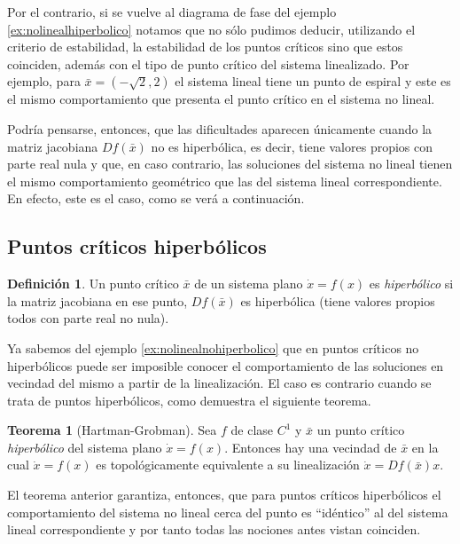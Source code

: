 \documentclass[11pt]{book}
\theoremstyle{definition}
\newtheorem{definition}{Definición}
\numberwithin{definition}{section}
\theoremstyle{theorem}
\newtheorem{theorem}{Teorema}
\numberwithin{theorem}{section}
\numberwithin{lemma}{section}
\numberwithin{corollary}{section}
\theoremstyle{plain}
\numberwithin{example}{section}
\begin{document}
Por el contrario, si se vuelve al diagrama de fase del ejemplo \ref{ex:nolinealhiperbolico} notamos que no sólo pudimos deducir, utilizando el criterio de estabilidad, la estabilidad de los puntos críticos sino que estos coinciden, además con el tipo de punto crítico del sistema linealizado. Por ejemplo, para $\bar{x} = (-\sqrt{2},2)$ el sistema lineal tiene un punto de espiral y este es el mismo comportamiento que presenta el punto crítico en el sistema no lineal.

Podría pensarse, entonces, que las dificultades aparecen únicamente cuando la matriz jacobiana $Df(\bar{x})$ no es hiperbólica, es decir, tiene valores propios con parte real nula y que, en caso contrario, las soluciones del sistema no lineal tienen el mismo comportamiento geométrico que las del sistema lineal correspondiente. En efecto, este es el caso, como se verá a continuación.

\subsection{Puntos críticos hiperbólicos}

\begin{definition}Un punto crítico $\bar{x}$ de un sistema plano $\dot{x} = f(x)$ es \emph{hiperbólico} si la matriz jacobiana en ese punto, $Df(\bar{x})$ es hiperbólica (tiene valores propios todos con parte real no nula).
\end{definition}

Ya sabemos del ejemplo \ref{ex:nolinealnohiperbolico} que en puntos críticos no hiperbólicos puede ser imposible conocer el comportamiento de las soluciones en vecindad del mismo a partir de la linealización. El caso es contrario cuando se trata de puntos hiperbólicos, como demuestra el siguiente teorema.

\begin{theorem}[Hartman-Grobman] \label{teo:hartmangrobman}
Sea $f$ de clase $C^1$ y $\bar{x}$ un punto crítico \emph{hiperbólico} del sistema plano $\dot{x} = f(x)$. Entonces hay una vecindad de $\bar{x}$ en la cual $\dot{x} = f(x)$ es topológicamente equivalente a su linealización $\dot{x} = Df(\bar{x})x$.
\end{theorem}

El teorema anterior garantiza, entonces, que para puntos críticos hiperbólicos el comportamiento del sistema no lineal cerca del punto es ``idéntico'' al del sistema lineal correspondiente y por tanto todas las nociones antes vistan coinciden.
\end{document}
